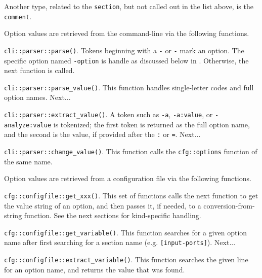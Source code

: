   Another type, related to the \texttt{section}, but not called out
   in the list above, is the \texttt{comment}.

   Option values are retrieved from the command-line via the following
   functions.

      \begin{enumber}
         \item \texttt{cli::parser::parse()}.
            Tokens beginning with a \texttt{-} or \texttt{-\-}
            mark an option.
            The specific option named \texttt{-\-option} is handle
            as discussed below in
            .
            Otherwise, the next function is called.
         \item \texttt{cli::parser::parse\_value()}.
            This function handles single-letter codes and full option
            names. Next...
         \item \texttt{cli::parser::extract\_value()}.
            A token such as
            \texttt{-a},
            \texttt{-a:value}, or
            \texttt{-\-analyze:value}
            is tokenized; the first token is returned as the
            full option name, and the second is the value, if
            provided after the \texttt{:} or \texttt{=}.
            Next...
         \item \texttt{cli::parser::change\_value()}.
            This function calls the \texttt{cfg::options} function
            of the same name.
      \end{enumber}

   Option values are retrieved from a configuration file via the
   following functions.

      \begin{enumber}
         \item \texttt{cfg::configfile::get\_xxx()}.
            This set of functions calls the next function to
            get the value string of an option, and then
            passes it, if needed, to a conversion-from-string
            function. See the next sections for kind-specific
            handling.
         \item \texttt{cfg::configfile::get\_variable()}.
            This function searches for a given option name
            after first searching for a section name 
            (e.g. \texttt{[input-ports]}).
            Next...
         \item \texttt{cfg::configfile::extract\_variable()}.
            This function searches the given line
            for an option name, and returns the value that was
            found.
      \end{enumber}

